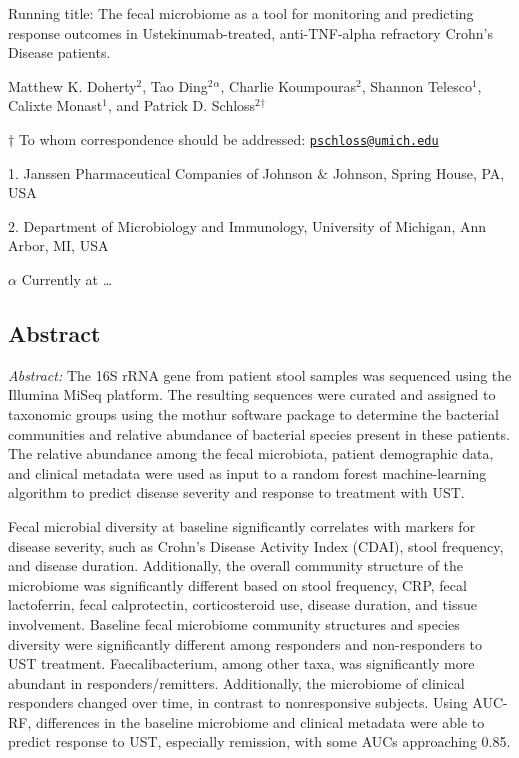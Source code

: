 \documentclass[11pt,]{article}
\begin{document}
\vspace{35mm}

Running title: The fecal microbiome as a tool for monitoring and
predicting response outcomes in Ustekinumab-treated, anti-TNF-alpha
refractory Crohn's Disease patients.

\vspace{35mm} Matthew K. Doherty\({^2}\), Tao Ding\({^2}\)\({^\alpha}\),
Charlie Koumpouras\({^2}\), Shannon Telesco\({^1}\), Calixte
Monast\({^1}\), and Patrick D. Schloss\({^2}\)\({^\dagger}\)

\(\dagger\) To whom correspondence should be addressed:
\href{mailto:pschloss@umich.edu}{\nolinkurl{pschloss@umich.edu}}

1. Janssen Pharmaceutical Companies of Johnson \({\&}\) Johnson, Spring
House, PA, USA

2. Department of Microbiology and Immunology, University of Michigan,
Ann Arbor, MI, USA

\({\alpha}\) Currently at \emph{\ldots{}}

\newpage

\subsection{Abstract}\label{abstract}

\emph{Abstract:} The 16S rRNA gene from patient stool samples was
sequenced using the Illumina MiSeq platform. The resulting sequences
were curated and assigned to taxonomic groups using the mothur software
package to determine the bacterial communities and relative abundance of
bacterial species present in these patients. The relative abundance
among the fecal microbiota, patient demographic data, and clinical
metadata were used as input to a random forest machine-learning
algorithm to predict disease severity and response to treatment with
UST.

Fecal microbial diversity at baseline significantly correlates with
markers for disease severity, such as Crohn's Disease Activity Index
(CDAI), stool frequency, and disease duration. Additionally, the overall
community structure of the microbiome was significantly different based
on stool frequency, CRP, fecal lactoferrin, fecal calprotectin,
corticosteroid use, disease duration, and tissue involvement. Baseline
fecal microbiome community structures and species diversity were
significantly different among responders and non-responders to UST
treatment. Faecalibacterium, among other taxa, was significantly more
abundant in responders/remitters. Additionally, the microbiome of
clinical responders changed over time, in contrast to nonresponsive
subjects. Using AUC-RF, differences in the baseline microbiome and
clinical metadata were able to predict response to UST, especially
remission, with some AUCs approaching 0.85.
\end{document}
